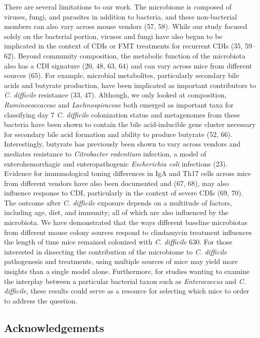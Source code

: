 \documentclass[11pt,]{article}
\begin{document}
There are several limitations to our work. The microbiome is composed of
viruses, fungi, and parasites in addition to bacteria, and these
non-bacterial members can also vary across mouse vendors (57, 58). While
our study focused solely on the bacterial portion, viruses and fungi
have also begun to be implicated in the context of CDIs or FMT
treatments for recurrent CDIs (35, 59--62). Beyond community
composition, the metabolic function of the microbiota also has a CDI
signature (20, 48, 63, 64) and can vary across mice from different
sources (65). For example, microbial metabolites, particularly secondary
bile acids and butyrate production, have been implicated as important
contributors to \emph{C. difficile} resistance (33, 47). Although, we
only looked at composition, \emph{Ruminococcaceae} and
\emph{Lachnospiraceae} both emerged as important taxa for classifying
day 7 \emph{C. difficile} colonization status and metagenomes from these
bacteria have been shown to contain the bile acid-inducible gene cluster
necessary for secondary bile acid formation and ability to produce
butyrate (52, 66). Interestingly, butyrate has previously been shown to
vary across vendors and mediates resistance to \emph{Citrobacter
rodentium} infection, a model of enterohemorrhagic and enteropathogenic
\emph{Escherichia coli} infections (23). Evidence for immunological
toning differences in IgA and Th17 cells across mice from different
vendors have also been documented and (67, 68), may also influence
response to CDI, particularly in the context of severe CDIs (69, 70).
The outcome after \emph{C. difficile} exposure depends on a multitude of
factors, including age, diet, and immunity; all of which are also
influenced by the microbiota. We have demonstrated that the ways
different baseline microbiotas from different mouse colony sources
respond to clindamycin treatment influences the length of time mice
remained colonized with \emph{C. difficile} 630. For those interested in
dissecting the contribution of the microbiome to \emph{C. difficile}
pathogenesis and treatments, using multiple sources of mice may yield
more insights than a single model alone. Furthermore, for studies
wanting to examine the interplay between a particular bacterial taxon
such as \emph{Enterococcus} and \emph{C. difficile}, these results could
serve as a resource for selecting which mice to order to address the
question.

\newpage

\subsection{Acknowledgements}\label{acknowledgements}
\end{document}
